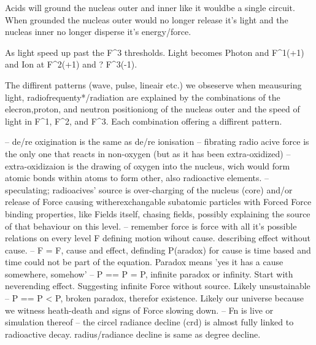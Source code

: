 Acids will ground the nucleas outer and inner like it wouldbe a single circuit. When grounded the nucleas outer would no longer release it's light and the nucleas inner no longer disperse it's energy/force.

As light speed up past the F^3 thresholds. Light becomes Photon and F^1(+1) and Ion at F^2(+1) and ? F^3(-1). 

The diffirent patterns (wave, pulse, lineair etc.) we obseserve when meausuring light, radiofrequenty*/radiation are explained by the combinations of the elecron,proton, 
and neutron positioniong of the nucleas outer and the speed of light in F^1, F^2, and F^3. Each combination offering a diffirent pattern.

-- de/re oxigination is the same as de/re ionisation
-- fibrating radio acive force is the only one that reacts in non-oxygen (but as it has been extra-oxidized)
-- extra-oxidizaion is the drawing of oxygen into the nucleus, wich would form atomic bonds within atoms to form other, also radioactive elements.
-- speculating; radioacives' source is over-charging of the nucleus (core) and/or release of Force causing witherexchangable subatomic particles with Forced Force binding properties,
like Fields itself, chasing fields, possibly explaining the source of that behaviour on this level.
-- remember force is force with all it's possible relations on every level F defining motion wihout cause. describing effect without cause.
-- F = F, cause and effect, definding P(aradox) for cause is time based and time could not be part of the equation. Paradox means 'yes it has a cause somewhere, somehow'
-- P == P = P, infinite paradox or infinity. Start with neverending effect. Suggesting infinite Force without source. Likely unsustainable
-- P == P < P, broken paradox, therefor existence. Likely our universe because we witness heath-death and signs of Force slowing down.
-- Fn is live or simulation thereof
-- the circel radiance decline (crd) is almost fully linked to radioactive decay. radius/radiance decline is same as degree decline.



